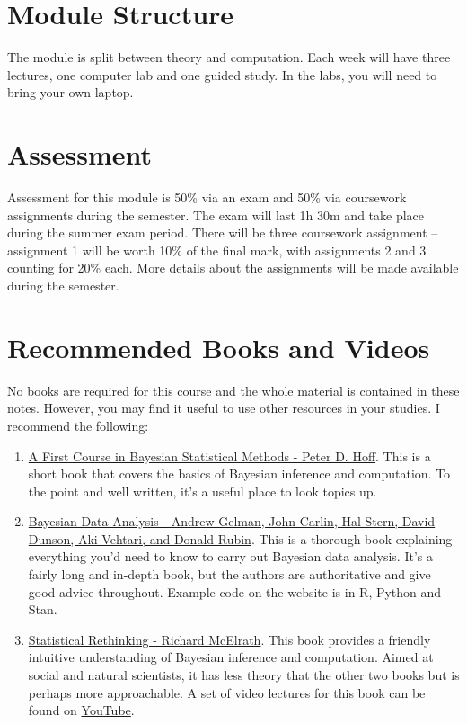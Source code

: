 \documentclass[
]{book}
\theoremstyle{definition}
\theoremstyle{definition}
\theoremstyle{definition}
\theoremstyle{definition}
\theoremstyle{remark}
\begin{document}
\section{Module Structure}\label{module-structure}

The module is split between theory and computation. Each week will have three lectures, one computer lab and one guided study. In the labs, you will need to bring your own laptop.

\section{Assessment}\label{assessment}

Assessment for this module is 50\% via an exam and 50\% via coursework
assignments during the semester. The exam will last 1h 30m and take
place during the summer exam period. There will be three coursework
assignment -- assignment 1 will be worth 10\% of the final mark, with
assignments 2 and 3 counting for 20\% each. More details about the
assignments will be made available during the semester.

\section{Recommended Books and Videos}\label{recommended-books-and-videos}

No books are required for this course and the whole material is
contained in these notes. However, you may find it useful to use other
resources in your studies. I recommend the following:

\begin{enumerate}
\def\labelenumi{\arabic{enumi}.}
\item
  \href{https://link.springer.com/book/10.1007/978-0-387-92407-6}{A First Course in Bayesian Statistical Methods - Peter D.
  Hoff}.
  This is a short book that covers the basics of Bayesian inference
  and computation. To the point and well written, it's a useful place
  to look topics up.
\item
  \href{http://www.stat.columbia.edu/~gelman/book/}{Bayesian Data Analysis - Andrew Gelman, John Carlin, Hal Stern,
  David Dunson, Aki Vehtari, and Donald
  Rubin}. This is a
  thorough book explaining everything you'd need to know to carry out
  Bayesian data analysis. It's a fairly long and in-depth book, but
  the authors are authoritative and give good advice throughout.
  Example code on the website is in R, Python and Stan.
\item
  \href{https://xcelab.net/rm/statistical-rethinking/}{Statistical Rethinking - Richard
  McElrath}. This book
  provides a friendly intuitive understanding of Bayesian inference
  and computation. Aimed at social and natural scientists, it has less
  theory that the other two books but is perhaps more approachable. A
  set of video lectures for this book can be found on
  \href{https://www.youtube.com/playlist?list=PLDcUM9US4XdMROZ57-OIRtIK0aOynbgZN}{YouTube}.
\end{enumerate}
\end{document}
